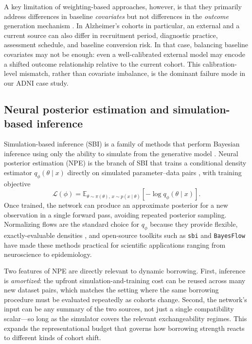 A key limitation of weighting-based approaches, however, is that they
primarily address differences in baseline \emph{covariates} but not
differences in the \emph{outcome} generation mechanism
\citep{viele2014use,dahabreh2019generalizing}.
In Alzheimer's cohorts in particular, an external and a current source can
also differ in recruitment period, diagnostic practice, assessment schedule,
and baseline conversion risk.
In that case, balancing baseline covariates may not be enough: even a
well-calibrated external model may encode a shifted outcome relationship
relative to the current cohort.
This calibration-level mismatch, rather than covariate imbalance, is the
dominant failure mode in our ADNI case study.

\subsection{Neural posterior estimation and simulation-based inference}

Simulation-based inference (SBI) is a family of methods that perform
Bayesian inference using only the ability to simulate from the generative
model \citep{cranmer2020frontier}.
Neural posterior estimation (NPE) is the branch of SBI that trains a
conditional density estimator $q_{\phi}(\theta \mid x)$ directly on
simulated parameter--data pairs
\citep{papamakarios2016fast,papamakarios2019sequential,greenberg2019automatic,
lueckmann2021benchmarking}, with training objective
\begin{equation}
\mathcal{L}(\phi)
=
\mathbb{E}_{\theta \sim \pi(\theta),\, x \sim p(x\mid \theta)}
\left[-\log q_{\phi}(\theta \mid x)\right].
\end{equation}
Once trained, the network can produce an approximate posterior for a new
observation in a single forward pass, avoiding repeated posterior sampling.
Normalizing flows are the standard choice for $q_\phi$ because they provide
flexible, exactly-evaluable densities
\citep{papamakarios2021normalizing}, and open-source toolkits such as
\texttt{sbi} \citep{tejerocantero2020sbi} and \texttt{BayesFlow}
\citep{radev2022bayesflow} have made these methods practical for scientific
applications ranging from neuroscience \citep{goncalves2020training} to
epidemiology.

Two features of NPE are directly relevant to dynamic borrowing.
First, inference is \emph{amortized}: the upfront simulation-and-training
cost can be reused across many new dataset pairs, which matches the setting
where the same borrowing procedure must be evaluated repeatedly as cohorts
change.
Second, the network's input can be any summary of the two sources, not just
a single compatibility scalar---so long as the simulator covers the
relevant exchangeability regimes.
This expands the representational budget that governs how borrowing strength
reacts to different kinds of cohort shift.

